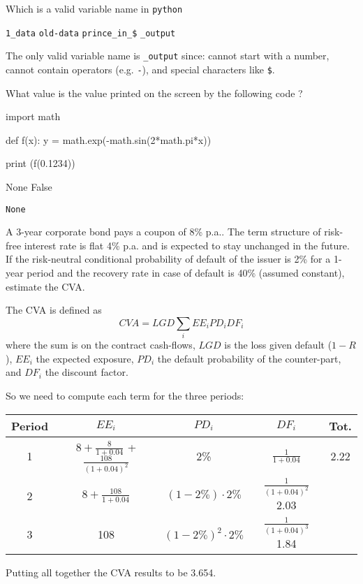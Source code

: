 \documentclass[12pt,a4paper]{exam}
\begin{document}
\begin{questions}
\question
Which is a valid variable name in \texttt{python} 

\begin{checkboxes}
\choice \texttt{1\_data}
\choice \texttt{old-data}
\choice \texttt{prince\_in\_\$}
\choice \texttt{\_output}
\end{checkboxes}
\begin{solution}
The only valid variable name is \texttt{\_output} since: cannot start with a number, cannot contain operators (e.g. \texttt{-}), and special characters like \texttt{\$}.
\end{solution}

\question
What value is the value printed on the screen by the following code ?
\begin{ipython}
import math

def f(x):
	y = math.exp(-math.sin(2*math.pi*x))

print (f(0.1234))
\end{ipython}

\begin{checkboxes}
\choice None
\choice False
\end{checkboxes}
\begin{solution}
\texttt{None}
\end{solution}

\question
A 3-year corporate bond pays a coupon of 8\% p.a.. The term structure of risk-free interest rate is flat 4\% p.a. and is expected to stay unchanged in the future. If the risk-neutral conditional probability of default of the issuer is 2\% for a 1-year period and the recovery rate in case of default is 40\% (assumed constant), estimate the CVA.

\fillwithlines{3cm}
\begin{solution}
The CVA is defined as 
\begin{equation*}
	CVA = LGD\sum_i EE_i PD_i DF_i
\end{equation*}
where the sum is on the contract cash-flows, $LGD$ is the loss given default ($1-R$), $EE_i$ the expected exposure, $PD_i$ the default probability of the counter-part, and $DF_i$ the discount factor.

So we need to compute each term for the three periods:

\begin{center}
\begin{tabular}{|c|c|c|c|c|}
\hline
Period & $EE_i$ & $PD_i$ & $DF_i$ & Tot. \\
\hline
1 & $8 + \frac{8}{1+0.04}$ + $\frac{108}{(1+0.04)^2}$ & 2\% & $\frac{1}{1+0.04}$ & 2.22 \\
\hline
2 & $8 + \frac{108}{1+0.04}$ & $(1-2\%)\cdot 2\%$ & $\frac{1}{(1+0.04)^2}$ 2.03 \\
\hline
3 & 108 & $(1-2\%)^2\cdot 2\%$ & $\frac{1}{(1+0.04)^3}$ 1.84 \\
\hline
\end{tabular}
\end{center}
Putting all together the CVA results to be 3.654.


\end{solution}
\end{questions}
\end{document}
